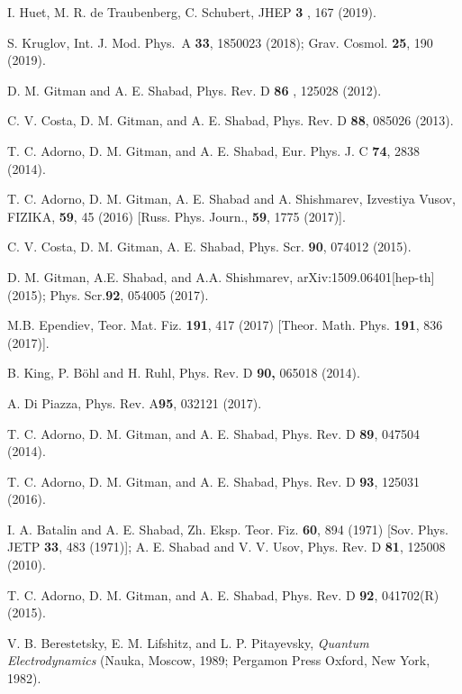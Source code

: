 \documentclass[12pt]{article}
\begin{document}
\begin{thebibliography}{99}
 I. Huet, M. R. de Traubenberg, C. Schubert, JHEP \textbf{3%
}, 167 (2019).

 S. Kruglov, Int. J. Mod. Phys.\ A \textbf{33}, 1850023
(2018); Grav. Cosmol. \textbf{25}, 190 (2019).

 D. M. Gitman and A. E. Shabad, Phys. Rev. D \textbf{86}%
, 125028 (2012).

 C. V. Costa, D. M. Gitman, and A. E. Shabad, Phys.
Rev. D \textbf{88}, 085026 (2013).

 T. C. Adorno, D. M. Gitman, and A. E. Shabad, Eur.
Phys. J. C \textbf{74}, 2838 (2014).

 T. C. Adorno, D. M. Gitman, A. E. Shabad and A.
Shishmarev, Izvestiya Vusov, FIZIKA, \textbf{59}, 45 (2016) [Russ. Phys.
Journ., \textbf{59}, 1775 (2017)].

 C. V. Costa, D. M. Gitman, A. E. Shabad, Phys. Scr. 
\textbf{90}, 074012 (2015).

 D. M. Gitman, A.E. Shabad, and A.A. Shishmarev,
arXiv:1509.06401[hep-th] (2015); Phys. Scr.\textbf{92}, 054005 (2017).

 M.B. Ependiev, Teor. Mat. Fiz. \textbf{191}, 417 (2017)
[Theor. Math. Phys. \textbf{191}, 836 (2017)].

 B. King, P. B\"{o}hl and H. Ruhl, Phys. Rev. D \textbf{90,}
065018 (2014).

 A. Di Piazza, Phys. Rev. A\textbf{95}, 032121 (2017).

 T. C. Adorno, D. M. Gitman, and A. E. Shabad, Phys.
Rev. D \textbf{89}, 047504 (2014).

 T. C. Adorno, D. M. Gitman, and A. E. Shabad, Phys.
Rev. D \textbf{93}, 125031 (2016).

 I. A. Batalin and A. E. Shabad, Zh. Eksp. Teor. Fiz. 
\textbf{60}, 894 (1971) [Sov. Phys. JETP \textbf{33}, 483 (1971)]; A. E.
Shabad and V. V. Usov, Phys. Rev. D \textbf{81}, 125008 (2010).

 T. C. Adorno, D. M. Gitman, and A. E. Shabad, Phys.
Rev. D \textbf{92}, 041702(R) (2015).

 V. B. Berestetsky, E. M. Lifshitz, and L. P. Pitayevsky, 
\emph{Quantum Electrodynamics} (Nauka, Moscow, 1989; Pergamon Press Oxford,
New York, 1982).


\end{thebibliography}
\end{document}
